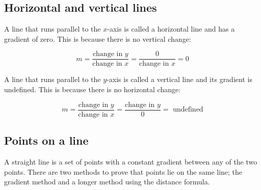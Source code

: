 \subsection*{Horizontal and vertical lines}

A line that runs parallel to the $x$-axis is called a horizontal line and has a gradient of zero. This is
because there is no vertical change:\par
\begin{equation*}m = \dfrac{\mbox{change in }y}{\mbox{change in }x} = \dfrac{0}{\mbox{change in }x} =0\end{equation*}

A line that runs parallel to the $y$-axis is called a vertical line and its gradient is undefined. This is because there is no horizontal change:\par
\begin{equation*}
  m = \dfrac{\mbox{change in }y}{\mbox{change in }x} = \dfrac{\mbox{change in }y}{0}=\mbox{ undefined}
\end{equation*}

\subsection*{Points on a line}
A straight line is a set of points with a constant gradient between any of the two points.
There are two methods to prove that points lie on the same line; the gradient method and a
longer method using the distance formula.


